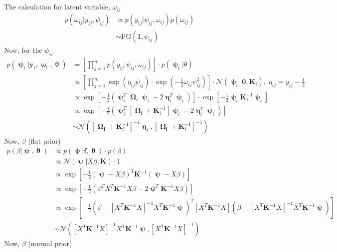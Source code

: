 \documentclass[11pt]{article}
\newcommand{\pN}{\mathcal{N}}
\newcommand{\1}{\mathbf{1}}
\newcommand{\0}{\mathbf{0}}
\newcommand{\f}{\mathbf{f}}
\newcommand{\K}{\mathbf{K}}
\newcommand{\y}{\mathbf{y}}
\newcommand{\bmpsi}{\bm{\uppsi}}
\begin{document}
The calculation for latent variable, $\omega_{ij}$
%
%
%
\begin{align*}
	p(\omega_{ij} | y_{ij}, \psi_{ij}) &\propto p(y_{ij} | \psi_{ij}, \omega_{ij}) p(\omega_{ij}) \\
	&\sim \text{PG}(1, \psi_{ij})
\end{align*}
%
%
%
Now, for the $\psi_{ij}$
%
%
%
\begin{align*}
	p(\bmpsi_i | \y_i, \bm{\upomega}_i, \bm{\uptheta} ) &= \left[ \prod_{j=1}^{n_i} p(y_{ij} | \psi_{ij}, \omega_{ij}) \right] \cdot p(\bmpsi_i | \theta) \\
	&\propto \left[ \prod_{j=1}^{n_i} \exp\left( \eta_{ij}\psi_{ij} \right) \cdot \exp \left( -\frac{1}{2} \omega_{ij}\psi_{ij}^2 \right) \right] \cdot \pN(\bmpsi_i | \mathbf{0}, \K_i), \; \eta_{ij} = y_{ij} - \frac{1}{2} \\
	&\propto \exp \left[ -\frac{1}{2}\left( \bmpsi_i^T \bm{\upOmega}_i \bmpsi_i - 2\bm{\upeta}_i^T\bmpsi_i \right) \right] \cdot \exp \left[ -\frac{1}{2} \bmpsi_i \K_i^{-1} \bmpsi_i \right] \\
	&\propto \exp \left[ -\frac{1}{2}\left( \bmpsi_i^T \left[ \bm{\upOmega_i} + \K_i^{-1} \right] \bmpsi_i - 2\bm{\upeta}_i^T \bmpsi_i \right) \right] \\
	&\sim \pN \left( \left[ \bm{\upOmega_i} + \K_i^{-1} \right]^{-1}\bm{\upeta}_i, \left[ \bm{\upOmega_i} + \K_i^{-1} \right]^{-1}   \right)
\end{align*}
%
%
%
Now, $\beta$ (flat prior)
%
%
%
\begin{align*}
	p(\beta | \bmpsi, \bm{\uptheta}) &\propto p(\bmpsi | \f, \bm{\uptheta}) \cdot p(\beta) \\
	&\propto  \pN(\bmpsi | X \beta, \K)  \cdot 1 \\
	&\propto \exp\left[ -\frac{1}{2} (\bmpsi - X\beta)^T\K^{-1}(\bmpsi - X\beta) \right] \\
	&\propto \exp\left[ -\frac{1}{2}\left( \beta^TX^T \K^{-1} X\beta - 2\bmpsi^T \K^{-1}X\beta \right) \right] \\
	&\propto \exp\left[ -\frac{1}{2} \left( \beta - \left[ X^T \K^{-1} X \right]^{-1} X^T \K^{-1}\bmpsi \right)^T \left[ X^T \K^{-1} X \right] \left( \beta - \left[ X^T \K^{-1} X \right]^{-1} X^T \K^{-1}\bmpsi \right)\right] \\
	&\sim \pN \left( \left[ X^T \K^{-1} X \right]^{-1} X^T \K^{-1}\bmpsi, \left[ X^T \K^{-1} X \right]^{-1} \right)
\end{align*}
%
%
%
Now, $\beta$ (normal prior)
%
%
%
\end{document}
